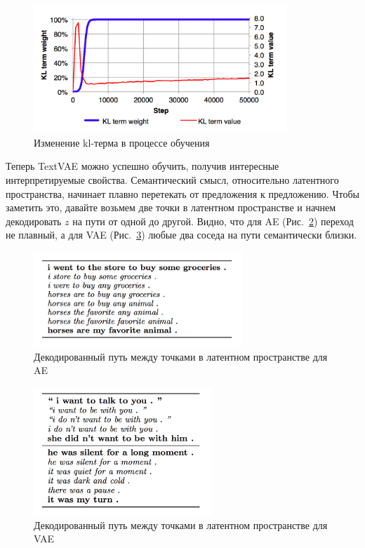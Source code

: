 \documentclass{spbau-diploma}
\begin{document}
\begin{figure}[H]
\centering
\includegraphics[width=0.85\textwidth]{images/kl_term_w.png}
\caption{Изменение kl-терма в процессе обучения~\cite{text_vae}}
\label{kl_term_w}
\end{figure}

Теперь TextVAE можно успешно обучить, получив интересные интерпретируемые 
свойства. Семантический смысл, относительно латентного 
пространства, начинает плавно перетекать от предложения к предложению. Чтобы 
заметить это, давайте возьмем две точки в латентном пространстве и начнем 
декодировать $z$ на пути от одной до другой. Видно, что для AE 
(Рис.~\ref{ae_path}) переход не плавный, а для VAE (Рис.~\ref{vae_path}) любые 
два соседа на пути семантически близки.

\begin{figure}[H]
\centering
\includegraphics[width=0.7\textwidth]{images/ae_path.png}
\caption{Декодированный путь между точками в латентном пространстве для AE~\cite{text_vae}}
\label{ae_path}
\end{figure}

\begin{figure}[H]
\centering
\includegraphics[width=0.6\textwidth]{images/vae_path.png}
\caption{Декодированный путь между точками в латентном пространстве для VAE~\cite{text_vae}}
\label{vae_path}
\end{figure}
\end{document}
